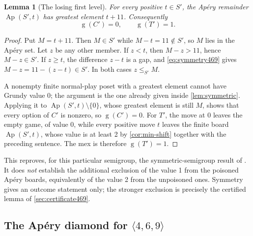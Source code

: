 \documentclass[11pt,letterpaper]{article}
\numberwithin{equation}{section}
\newtheorem{lemma}[theorem]{Lemma}
\theoremstyle{definition}
\theoremstyle{remark}
\newcommand{\sg}{\operatorname{g}}
\newcommand{\Ap}{\operatorname{Ap}}
\begin{document}
\begin{lemma}[The losing first level]\label{lem:base469}
For every positive $t\in S'$, the Ap\'ery remainder $\Ap(S',t)$ has
greatest element $t+11$. Consequently
\begin{equation}\label{eq:base469}
 \sg(C')=0,\qquad \sg(T')=1.
\end{equation}
\end{lemma}
\begin{proof}
Put $M=t+11$. Then $M\in S'$ while $M-t=11\notin S'$, so $M$ lies in the
Ap\'ery set. Let $z$ be any other member. If $z<t$, then $M-z>11$, hence
$M-z\in S'$. If $z\geq t$, the difference $z-t$ is a gap, and
\cref{eq:symmetry469} gives $M-z=11-(z-t)\in S'$. In both cases
$z\leq_{S'}M$.

A nonempty finite normal-play poset with a greatest element cannot have
Grundy value 0; the argument is the one already given inside
\cref{lem:symmetric}. Applying it to $\Ap(S',t)\setminus\{0\}$, whose
greatest element is still $M$, shows that every option of $C'$ is
nonzero, so $\sg(C')=0$. For $T'$, the move at 0 leaves the empty game,
of value 0, while every positive move $t$ leaves the finite board
$\Ap(S',t)$, whose value is at least 2 by \cref{cor:min-shift} together
with the preceding sentence. The mex is therefore
$\sg(T')=1$.
\end{proof}

This reproves, for this particular semigroup, the symmetric-semigroup
result of \cite[Theorem 2.4]{GMK18}. It does \emph{not} establish the
additional exclusion of the value 1 from the poisoned Ap\'ery boards,
equivalently of the value 2 from the unpoisoned ones. Symmetry gives an
outcome statement only; the stronger exclusion is precisely the certified
lemma of \cref{sec:certificate469}.

\subsection{The Ap\'ery diamond for \texorpdfstring{$\langle4,6,9\rangle$}{<4,6,9>}}
\label{sec:diamond469}
\end{document}
